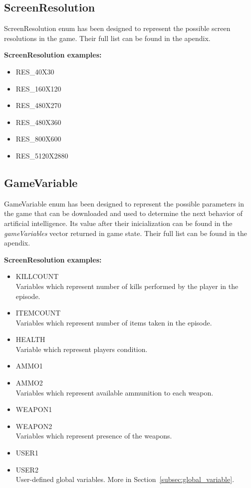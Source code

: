 \subsection{ScreenResolution} \label{subsec:screenresolution}
ScreenResolution enum has been designed to represent the possible screen resolutions in the game. Their full list can be found in the apendix.


\vspace{20pt}
\textbf{ScreenResolution examples:}
\begin{itemize}
\item RES\_40X30
\item RES\_160X120	
\item RES\_480X270	
\item RES\_480X360	
\item RES\_800X600
\item RES\_5120X2880
\end{itemize}

\subsection{GameVariable} \label{subsec:gamevar}
GameVariable enum has been designed to represent the possible parameters in the game that can be downloaded and used to determine the next behavior of artificial intelligence. Its value after their inicialization can be found in the \textit{gameVariables} vector returned in game state. Their full list can be found in the apendix.


\vspace{20pt}
\textbf{ScreenResolution examples:}
\begin{itemize}
\item KILLCOUNT\\
Variables which represent number of kills performed by the player in the episode.
\item ITEMCOUNT\\
Variables which represent number of items taken in the episode.
\item HEALTH\\
Variable which represent players condition.
\item AMMO1
\item AMMO2\\
Variables which represent available ammunition to each weapon.
\item WEAPON1
\item WEAPON2 \\
Variables which represent presence of the weapons.
\item USER1 \\
\item USER2 \\
User-defined global variables. More in Section~\ref{subsec:global_variable}.
\end{itemize}

